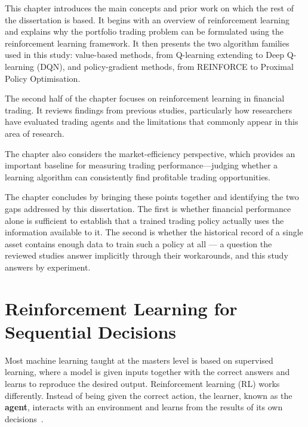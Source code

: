 
This chapter introduces the main concepts and prior work on which the
rest of the dissertation is based. It begins with an overview of
reinforcement learning and explains why the portfolio trading problem
can be formulated using the reinforcement learning framework. It then
presents the two algorithm families used in this study: value-based
methods, from Q-learning extending to Deep Q-learning (DQN), and
policy-gradient methods, from REINFORCE to Proximal Policy Optimisation.

The second half of the chapter focuses on reinforcement learning in
financial trading. It reviews findings from previous studies,
particularly how researchers have evaluated trading agents and the
limitations that commonly appear in this area of research.

The chapter also considers the market-efficiency perspective, which
provides an important baseline for measuring trading performance---judging whether a learning algorithm can consistently find profitable
trading opportunities.

The chapter concludes by bringing these points together and identifying
the two gaps addressed by this dissertation. The first is whether
financial performance alone is sufficient to establish that a trained
trading policy actually uses the information available to it. The second
is whether the historical record of a single asset contains enough data
to train such a policy at all --- a question the reviewed studies answer
implicitly through their workarounds, and this study answers by
experiment.

\section{Reinforcement Learning for Sequential Decisions}
Most machine learning taught at the master\textquotesingle s level is
based on supervised learning, where a model is given inputs together
with the correct answers and learns to reproduce the desired output.
Reinforcement learning (RL) works differently. Instead of being given
the correct action, the learner, known as the \textbf{agent}, interacts
with an environment and learns from the results of its own decisions~\cite{sutton2018}.

